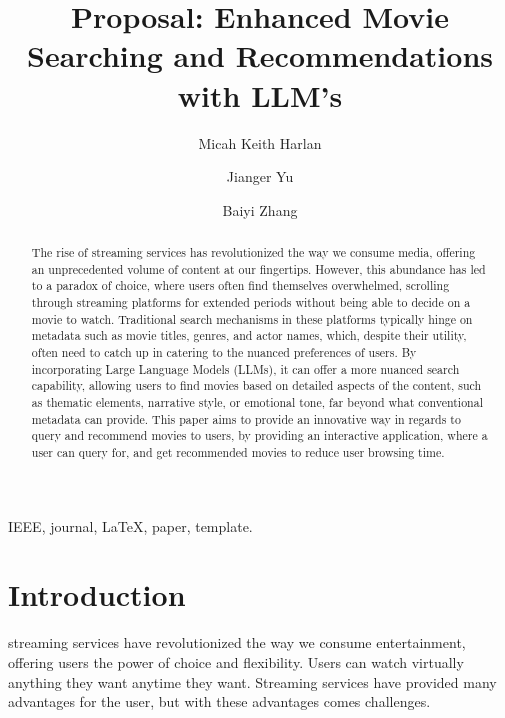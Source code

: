 \documentclass[journal]{IEEEtran}
\begin{document}
\title{Proposal: Enhanced Movie Searching and Recommendations with LLM’s}

\author[1]{Micah Keith Harlan}
\author[1]{Jianger Yu}
\author[1]{Baiyi Zhang}


\maketitle

\begin{abstract}
The rise of streaming services has revolutionized the way we consume media, offering an unprecedented volume of content at our fingertips. However, this abundance has led to a paradox of choice, where users often find themselves overwhelmed, scrolling through streaming platforms for extended periods without being able to decide on a movie to watch. Traditional search mechanisms in these platforms typically hinge on metadata such as movie titles, genres, and actor names, which, despite their utility, often need to catch up in catering to the nuanced preferences of users. By incorporating Large Language Models (LLMs), it can offer a more nuanced search capability, allowing users to find movies based on detailed aspects of the content, such as thematic elements, narrative style, or emotional tone, far beyond what conventional metadata can provide. This paper aims to provide an innovative way in regards to query and recommend movies to users, by providing an interactive application, where a user can query for, and get recommended movies to reduce user browsing time.
\end{abstract}

\begin{IEEEkeywords}
IEEE, journal, \LaTeX, paper, template.
\end{IEEEkeywords}

\section{Introduction}
 streaming services have revolutionized the way we consume entertainment, offering users the power of choice and flexibility. Users can watch virtually anything they want anytime they want. Streaming services have provided many advantages for the user, but with these advantages comes challenges. 
\end{document}
